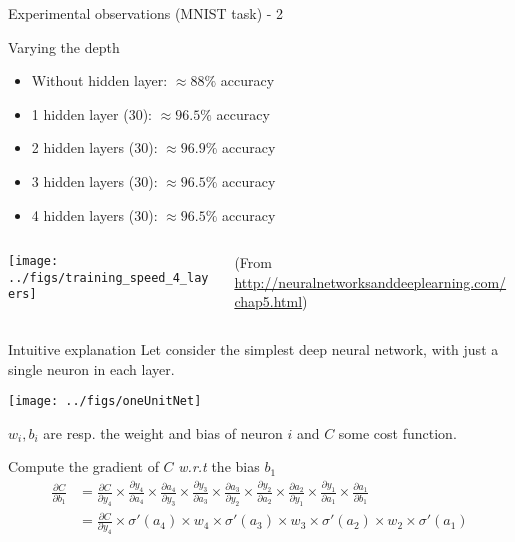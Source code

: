 \begin{frame}{Experimental observations (MNIST task) - 2}
  \begin{block}{Varying the depth}
    \begin{itemize}
    \item Without hidden layer:  $\approx 88\%$ accuracy
    \item 1 hidden layer (30): $\approx 96.5\%$ accuracy
    \item 2 hidden layers (30): $\approx 96.9\%$ accuracy
    \item 3 hidden layers (30): $\approx 96.5\%$ accuracy
    \item 4 hidden layers (30): $\approx 96.5\%$ accuracy
    \end{itemize}
  \end{block}\pause
  \begin{columns}
    \begin{column}{0.5\textwidth}
      \texttt{[image: ../figs/training\_speed\_4\_layers]}
    \end{column}
    \begin{column}{0.5\textwidth}
      \scriptsize (From \url{http://neuralnetworksanddeeplearning.com/chap5.html})
    \end{column}
  \end{columns}
\end{frame}


\begin{frame}{Intuitive explanation}
  Let consider the simplest deep neural network, with just a single neuron in each layer.
  \begin{center}
    \texttt{[image: ../figs/oneUnitNet]}
  \end{center}
  $w_i, b_i$ are resp. the weight and bias of neuron $i$ and $C$ some cost function. 
  \begin{block}{Compute the gradient of $C$ \textit{w.r.t} the bias $b_1$}
    \begin{align}
      \frac{\partial C }{\partial b_1} &=       \frac{\partial C}{\partial y_4}      \times
      \frac{\partial y_4}{\partial a_4}   \times \frac{\partial a_4}{\partial y_3} \times
      \frac{\partial y_3}{\partial a_3}   \times \frac{\partial a_3}{\partial y_2} \times
      \frac{\partial y_2}{\partial a_2}   \times \frac{\partial a_2}{\partial y_1} \times
      \frac{\partial y_1}{\partial a_1}   \times \frac{\partial a_1}{\partial b_1} \\
      &=       \frac{\partial C}{\partial y_4}      \times
      \sigma'(a_4) \times w_4 \times
      \sigma'(a_3) \times w_3 \times
      \sigma'(a_2) \times w_2 \times
      \sigma'(a_1) 
    \end{align}
  \end{block}
\end{frame}

